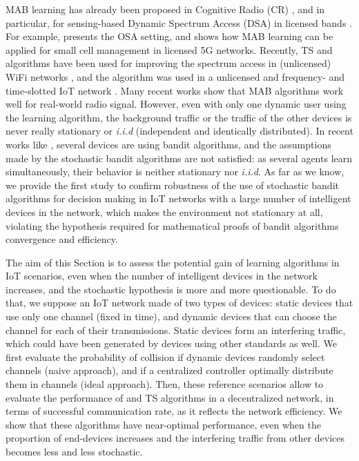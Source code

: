 MAB learning has already been proposed in Cognitive Radio (CR) \cite{Haykin}, and in particular, for sensing-based Dynamic Spectrum Access (DSA) in licensed bands \cite{Jouini}.
For example, \cite{Jouini} presents the OSA setting, and \cite{Maghsudi} shows how MAB learning can be applied for small cell management in licensed 5G networks.
Recently, TS and \UCB{} algorithms have been used for improving the spectrum access in (unlicensed) WiFi networks \cite{Toldov}, and the \UCB{} algorithm was used in a unlicensed and frequency- and time-slotted IoT network \cite{Bonnefoi}.
Many recent works show that MAB algorithms work well for real-world radio signal.
However, even with only one dynamic user using the learning algorithm, the background traffic or the traffic of the other devices is never really stationary or \emph{i.i.d} (independent and identically distributed).
In recent works like \cite{Bonnefoi}, several devices are using bandit algorithms, and the assumptions made by the stochastic bandit algorithms are not satisfied: as several agents learn simultaneously, their behavior is neither stationary nor \emph{i.i.d}.
As far as we know, we provide the first study to confirm robustness of the use of stochastic bandit algorithms for decision making in IoT networks with a large number of intelligent devices in the network, which makes the environment not stationary at all, violating the hypothesis required for mathematical proofs of bandit algorithms convergence and efficiency.

The aim of this Section is to assess the potential gain of learning algorithms in IoT scenarios, even when the number of intelligent devices in the network increases, and the stochastic hypothesis is more and more questionable.
To do that, we suppose an IoT network made of two types of devices: static devices that use only one channel (fixed in time), and dynamic devices that can choose the channel for each of their transmissions. Static devices form an interfering traffic, which could have been generated by devices using other standards as well.
We first evaluate the probability of collision if dynamic devices randomly select channels (naive approach), and if a centralized controller optimally distribute them in channels (ideal approach).
Then, these reference scenarios allow to evaluate the performance of \UCB{} and TS algorithms in a decentralized network, in terms of successful communication rate, as it reflects the network efficiency.
We show that these algorithms have near-optimal performance, even when the proportion of end-devices increases and the interfering traffic from other devices becomes less and less stochastic.

